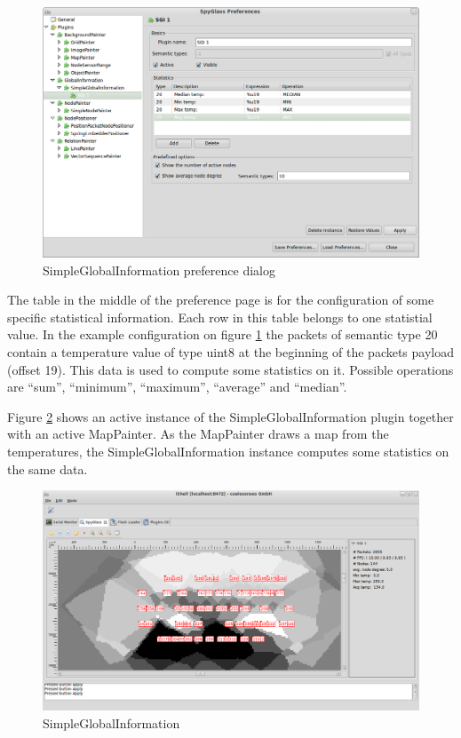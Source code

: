 \begin{figure}[htb]
  \begin{center}
    \includegraphics[width=13.2cm]{./pics/simpleglobalinformation_prefpage}
    \caption{SimpleGlobalInformation preference dialog}
    \label{pic:sgi_preferences}
  \end{center}
\end{figure}

The table in the middle of the preference page is for the configuration of some specific statistical information.
Each row in this table belongs to one statistial value. In the example configuration on figure \ref{pic:sgi_preferences}
the packets of semantic type 20 contain a temperature value of type uint8 at the beginning of the packets payload (offset 19).
This data is used to compute some statistics on it. Possible operations are ``sum'', ``minimum'', ``maximum'', 
``average'' and ``median''.

Figure \ref{pic:sgi} shows an active instance of the SimpleGlobalInformation plugin together with an active MapPainter.
As the MapPainter draws a map from the temperatures, the SimpleGlobalInformation instance computes some statistics
on the same data. 

\begin{figure}[htb]
  \begin{center}
    \includegraphics[width=13.2cm]{./pics/simpleglobalinformation}
    \caption{SimpleGlobalInformation}
    \label{pic:sgi}
  \end{center}
\end{figure}

